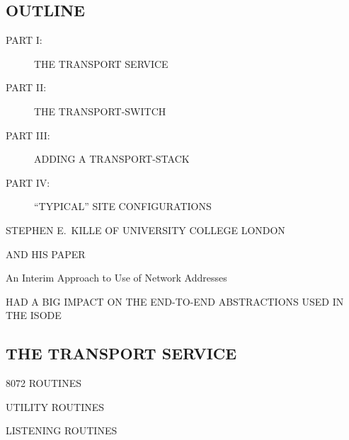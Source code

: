 

\begin{bwslide}
\part*	{OUTLINE}\bf

\begin{description}
\item[PART I:]		THE TRANSPORT SERVICE

\item[PART II:]		THE TRANSPORT-SWITCH

\item[PART III:]	ADDING A TRANSPORT-STACK

\item[PART IV:]		``TYPICAL'' SITE CONFIGURATIONS
\end{description}
\end{bwslide}


\begin{bwslide}

\begin{nrtc}
\item	STEPHEN E.~KILLE OF UNIVERSITY COLLEGE LONDON

\item	AND HIS PAPER
    \begin{nrtc}
    \item	An Interim Approach to Use of Network Addresses
    \end{nrtc}

\item	HAD A BIG IMPACT ON THE END-TO-END ABSTRACTIONS USED IN THE ISODE
\end{nrtc}
\end{bwslide}


\begin{bwslide}
\part	{THE TRANSPORT SERVICE}\bf

\begin{nrtc}
\item	8072 ROUTINES

\item	UTILITY ROUTINES

\item	LISTENING ROUTINES
\end{nrtc}
\end{bwslide}


